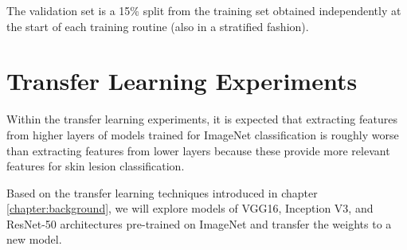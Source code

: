 The validation set is a 15\% split from the training set obtained independently at the start of each training routine (also in a stratified fashion).


\section{Transfer Learning Experiments}


Within the transfer learning experiments, it is expected that extracting features from higher layers of models trained for ImageNet\cite{imagenet} classification is roughly worse than extracting features from lower layers because these provide more relevant features for skin lesion classification.

Based on the transfer learning techniques introduced in chapter \ref{chapter:background}, we will explore models of VGG16, Inception V3, and ResNet-50 architectures pre-trained on ImageNet and transfer the weights to a new model.

